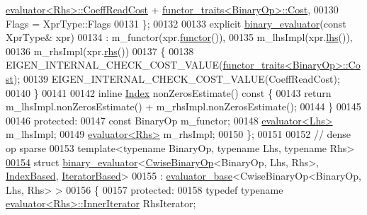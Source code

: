 \begin{DoxyCode}
      \hyperlink{struct_eigen_1_1internal_1_1evaluator}{evaluator<Rhs>::CoeffReadCost} + 
      \hyperlink{struct_eigen_1_1internal_1_1functor__traits}{functor\_traits<BinaryOp>::Cost},
00130     Flags = XprType::Flags
00131   \};
00132   
00133   \textcolor{keyword}{explicit} \hyperlink{struct_eigen_1_1internal_1_1binary__evaluator}{binary\_evaluator}(\textcolor{keyword}{const} XprType& xpr)
00134     : m\_functor(xpr.\hyperlink{group___core___module_acc4efe306adbdc0c95cc1c73a8cf81e4}{functor}()),
00135       m\_lhsImpl(xpr.\hyperlink{group___core___module_a0f73e7585dfb54d41c1983e1e6a4b269}{lhs}()), 
00136       m\_rhsImpl(xpr.\hyperlink{group___core___module_a3a61cbdf6d1adaa62f012045b04b6d09}{rhs}())  
00137   \{
00138     EIGEN\_INTERNAL\_CHECK\_COST\_VALUE(\hyperlink{struct_eigen_1_1internal_1_1functor__traits}{functor\_traits<BinaryOp>::Cost});
00139     EIGEN\_INTERNAL\_CHECK\_COST\_VALUE(CoeffReadCost);
00140   \}
00141   
00142   \textcolor{keyword}{inline} \hyperlink{namespace_eigen_a62e77e0933482dafde8fe197d9a2cfde}{Index} nonZerosEstimate()\textcolor{keyword}{ const }\{
00143     \textcolor{keywordflow}{return} m\_lhsImpl.nonZerosEstimate() + m\_rhsImpl.nonZerosEstimate();
00144   \}
00145 
00146 \textcolor{keyword}{protected}:
00147   \textcolor{keyword}{const} BinaryOp m\_functor;
00148   \hyperlink{struct_eigen_1_1internal_1_1evaluator}{evaluator<Lhs>} m\_lhsImpl;
00149   \hyperlink{struct_eigen_1_1internal_1_1evaluator}{evaluator<Rhs>} m\_rhsImpl;
00150 \};
00151 
00152 \textcolor{comment}{// dense op sparse}
00153 \textcolor{keyword}{template}<\textcolor{keyword}{typename} BinaryOp, \textcolor{keyword}{typename} Lhs, \textcolor{keyword}{typename} Rhs>
\hyperlink{struct_eigen_1_1internal_1_1binary__evaluator_3_01_cwise_binary_op_3_01_binary_op_00_01_lhs_00_0e1df6e69b5cafbc50d80e8ad3bfd660e}{00154} \textcolor{keyword}{struct }\hyperlink{struct_eigen_1_1internal_1_1binary__evaluator}{binary\_evaluator}<\hyperlink{group___core___module_class_eigen_1_1_cwise_binary_op}{CwiseBinaryOp}<BinaryOp, Lhs, Rhs>, 
      \hyperlink{struct_eigen_1_1internal_1_1_index_based}{IndexBased}, \hyperlink{struct_eigen_1_1internal_1_1_iterator_based}{IteratorBased}>
00155   : \hyperlink{struct_eigen_1_1internal_1_1evaluator__base}{evaluator\_base}<CwiseBinaryOp<BinaryOp, Lhs, Rhs> >
00156 \{
00157 \textcolor{keyword}{protected}:
00158   \textcolor{keyword}{typedef} \textcolor{keyword}{typename} \hyperlink{struct_eigen_1_1internal_1_1evaluator}{evaluator<Rhs>::InnerIterator}  RhsIterator;

\end{DoxyCode}
